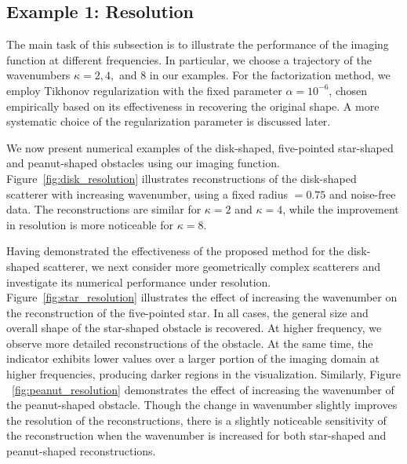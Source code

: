 \documentclass{article}
\begin{document}
\subsection{Example 1: Resolution}
The main task of this subsection is to illustrate the performance of the imaging function at different frequencies. In particular, we choose a trajectory of the wavenumbers $\kappa=2, 4,$ and $8$ in our examples. For the factorization method, we employ Tikhonov regularization with the fixed parameter $\alpha=10^{-6}$, chosen empirically based on its effectiveness in recovering the original shape. A more systematic choice of the regularization parameter is discussed later.

We now present numerical examples of the disk-shaped, five-pointed star-shaped and peanut-shaped obstacles using our imaging function. Figure~\ref{fig:disk_resolution} illustrates reconstructions of the disk-shaped
scatterer with increasing wavenumber, using a fixed radius $=0.75$ and noise-free data. The reconstructions are similar for
$\kappa=2$ and $\kappa=4$, while the improvement in resolution is more
noticeable for $\kappa=8$. 

Having demonstrated the effectiveness of the proposed method for the disk-shaped scatterer, we next consider more geometrically complex scatterers and investigate its numerical performance under resolution. Figure~\ref{fig:star_resolution} illustrates the effect of increasing the wavenumber on the reconstruction of the five-pointed star. In all cases, the general size and overall shape of the star-shaped obstacle is recovered. At higher frequency, we observe more detailed reconstructions of the obstacle. At the same time, the indicator exhibits lower values over a larger portion of the imaging domain at higher frequencies, producing darker regions in the visualization. Similarly, Figure ~\ref{fig:peanut_resolution} demonstrates the effect of increasing the wavenumber of the peanut-shaped obstacle. Though the change in wavenumber slightly improves the resolution of the reconstructions, there is a slightly noticeable sensitivity of the reconstruction when the wavenumber is increased for both star-shaped and peanut-shaped reconstructions.
\end{document}
